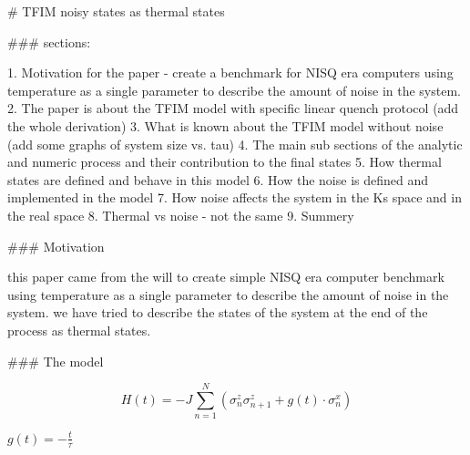 # TFIM noisy states as thermal states

### sections:

1. Motivation for the paper - create a benchmark for NISQ era computers using temperature as a single parameter to describe the amount of noise in the system.
2. The paper is about the TFIM model with specific linear quench protocol (add the whole derivation)
3. What is known about the TFIM model without noise (add some graphs of system size vs. tau)
4. The main sub sections of the analytic and numeric process and their contribution to the final states
5. How thermal states are defined and behave in this model
6. How the noise is defined and implemented in the model
7. How noise affects the system in the Ks space and in the real space
8. Thermal vs noise - not the same
9. Summery

### Motivation

this paper came from the will to create simple NISQ era computer benchmark using temperature as a single parameter to describe the amount of noise in the system. we have tried to describe the states of the system at the end of the process as thermal states.

### The model


\begin{equation} 
H(t) = -J \sum_{n=1}^{N} \left( \sigma_n^z \sigma_{n+1}^z + g(t) \cdot \sigma_n^x \right) 
\end{equation}


$ g(t) = -\frac{t}{\tau} $